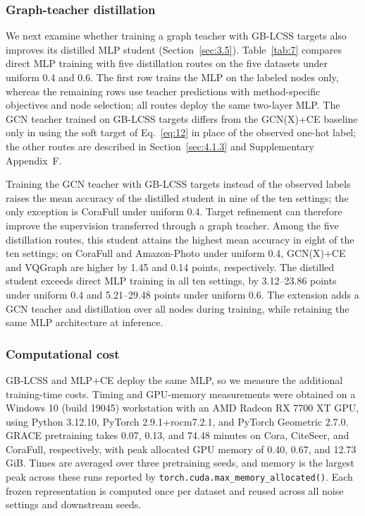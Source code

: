 \documentclass[times,review,10pt]{elsarticle}
\theoremstyle{definition}
\theoremstyle{plain}
\begin{document}
\subsubsection{Graph-teacher distillation}\label{sec:4.4.1}

We next examine whether training a graph teacher with GB-LCSS targets also improves its distilled MLP student (Section~\ref{sec:3.5}). Table~\ref{tab:7} compares direct MLP training with five distillation routes on the five datasets under uniform 0.4 and 0.6. The first row trains the MLP on the labeled nodes only, whereas the remaining rows use teacher predictions with method-specific objectives and node selection; all routes deploy the same two-layer MLP. The GCN teacher trained on GB-LCSS targets differs from the GCN(X)+CE baseline only in using the soft target of Eq.~\eqref{eq:12} in place of the observed one-hot label; the other routes are described in Section~\ref{sec:4.1.3} and Supplementary Appendix~F.

\begin{table}[!t]
\centering
\caption{Test accuracy of deployed MLPs under direct training and graph-to-MLP distillation.}\label{tab:7}

\end{table}

Training the GCN teacher with GB-LCSS targets instead of the observed labels raises the mean accuracy of the distilled student in nine of the ten settings; the only exception is CoraFull under uniform 0.4. Target refinement can therefore improve the supervision transferred through a graph teacher. Among the five distillation routes, this student attains the highest mean accuracy in eight of the ten settings; on CoraFull and Amazon-Photo under uniform 0.4, GCN(X)+CE and VQGraph are higher by 1.45 and 0.14 points, respectively. The distilled student exceeds direct MLP training in all ten settings, by 3.12--23.86 points under uniform 0.4 and 5.21--29.48 points under uniform 0.6. The extension adds a GCN teacher and distillation over all nodes during training, while retaining the same MLP architecture at inference.
\subsubsection{Computational cost}\label{sec:4.4.2}

GB-LCSS and MLP+CE deploy the same MLP, so we measure the additional training-time costs. Timing and GPU-memory measurements were obtained on a Windows 10 (build 19045) workstation with an AMD Radeon RX 7700 XT GPU, using Python 3.12.10, PyTorch 2.9.1+rocm7.2.1, and PyTorch Geometric 2.7.0. GRACE pretraining takes 0.07, 0.13, and 74.48 minutes on Cora, CiteSeer, and CoraFull, respectively, with peak allocated GPU memory of 0.40, 0.67, and 12.73 GiB. Times are averaged over three pretraining seeds, and memory is the largest peak across these runs reported by \texttt{torch.cuda.max\_memory\_allocated()}. Each frozen representation is computed once per dataset and reused across all noise settings and downstream seeds.
\end{document}
